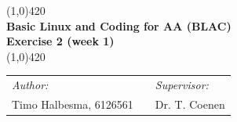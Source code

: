 \documentclass[a4paper]{article}
\begin{document}
\begin{center}
\line(1,0){420} \\
\huge \textbf{Basic Linux and Coding for AA (BLAC) \\ Exercise 2 (week 1)} \\
\line(1,0){420}
\end{center}

\vfill



\begin{table}[h]
\begin{center}
\begin{tabular}{lp{5cm}l}
\textit{Author:} & & \emph{Supervisor:} \\
Timo Halbesma, 6126561 & & Dr. T. Coenen\\
\end{tabular}
\end{center}
\end{table}


\newpage



%


%
\end{document}
